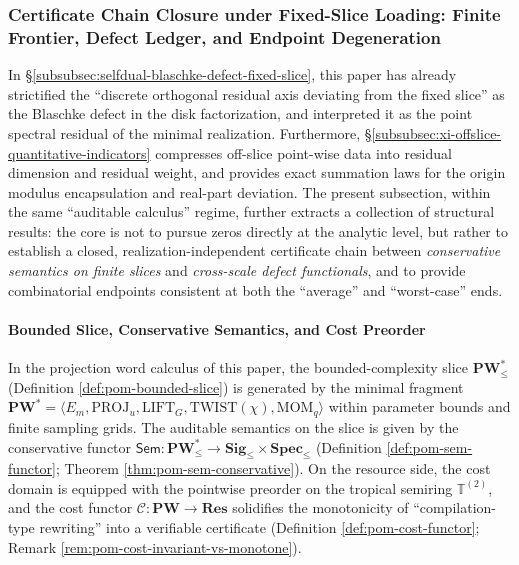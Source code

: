 \subsubsection{Certificate Chain Closure under Fixed-Slice Loading: Finite Frontier, Defect Ledger, and Endpoint Degeneration}\label{subsubsec:xi-fixed-slice-audit-chain}
In \S\ref{subsubsec:selfdual-blaschke-defect-fixed-slice}, this paper has already strictified the ``discrete orthogonal residual axis deviating from the fixed slice'' as the Blaschke defect in the disk factorization, and interpreted it as the point spectral residual of the minimal realization.
Furthermore, \S\ref{subsubsec:xi-offslice-quantitative-indicators} compresses off-slice point-wise data into residual dimension and residual weight, and provides exact summation laws for the origin modulus encapsulation and real-part deviation.
The present subsection, within the same ``auditable calculus'' regime, further extracts a collection of structural results: the core is not to pursue zeros directly at the analytic level, but rather to establish a closed, realization-independent certificate chain between \emph{conservative semantics on finite slices} and \emph{cross-scale defect functionals}, and to provide combinatorial endpoints consistent at both the ``average'' and ``worst-case'' ends.

\paragraph{Bounded Slice, Conservative Semantics, and Cost Preorder}
In the projection word calculus of this paper, the bounded-complexity slice \(\mathbf{PW}^{\ast}_{\le}\) (Definition \ref{def:pom-bounded-slice}) is generated by the minimal fragment
\(
\mathbf{PW}^{\ast}=\langle E_m,\mathrm{PROJ}_u,\mathrm{LIFT}_G,\mathrm{TWIST}(\chi),\mathrm{MOM}_q\rangle
\)
within parameter bounds and finite sampling grids.
The auditable semantics on the slice is given by the conservative functor
\(
\mathsf{Sem}:\mathbf{PW}^{\ast}_{\le}\to \mathbf{Sig}_{\le}\times\mathbf{Spec}_{\le}
\)
(Definition \ref{def:pom-sem-functor}; Theorem \ref{thm:pom-sem-conservative}).
On the resource side, the cost domain is equipped with the pointwise preorder on the tropical semiring \(\mathbb{T}^{(2)}\), and the cost functor \(\mathcal{C}:\mathbf{PW}\to\mathbf{Res}\) solidifies the monotonicity of ``compilation-type rewriting'' into a verifiable certificate (Definition \ref{def:pom-cost-functor}; Remark \ref{rem:pom-cost-invariant-vs-monotone}).

